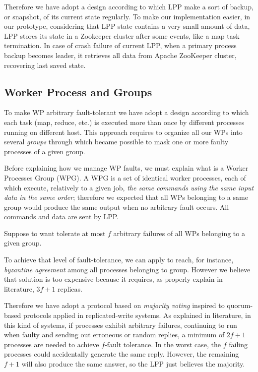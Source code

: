 \documentclass[sigchi]{acmart}
\begin{document}
Therefore we have adopt a design according to which LPP make a sort of backup, or snapshot, of its current state regularly. To make our implementation easier, in our prototype, considering that LPP state contains a very small amount of data, LPP stores its state in a Zookeeper cluster after some events, like a map task termination. In case of crash failure of current LPP, when a primary process backup becomes leader, it retrieves all data from Apache ZooKeeper cluster, recovering last saved state.

\subsection{Worker Process and Groups}

To make WP arbitrary fault-tolerant we have adopt a design according to which each task (map, reduce, etc.) is executed more than once by different processes running on different host. This approach requires to organize all our WPs into several \textit{groups} through which became possible to mask one or more faulty processes of a given group. 

Before explaining how we manage WP faults, we must explain what is a Worker Processes Group (WPG). A WPG is a set of identical worker processes, each of which execute, relatively to a given job, \textit{the same commands using the same input data in the same order}; therefore we expected that all WPs belonging to a same group would produce the same output when no arbitrary fault occurs. All commands and data are sent by LPP.

Suppose to want tolerate at most $f$ arbitrary failures of all WPs belonging to a given group. 

To achieve that level of fault-tolerance, we can apply to reach, for instance, \textit{byzantine agreement} among all processes belonging to group. However we believe that solution is too expensive because it requires, as properly explain in literature\citep{SDCC}, $3f + 1$ replicas.

Therefore we have adopt a protocol based on \textit{majority voting} inspired to quorum-based protocols applied in replicated-write systems. As explained in literature\citep{SDCC}, in this kind of systems, if processes exhibit arbitrary failures, continuing to run when faulty and sending out erroneous or random replies, a minimum of $2f+1$ processes are needed to achieve $f$-fault tolerance. In the worst case, the $f$ failing processes could accidentally generate the same reply. However, the remaining $f+1$ will also produce the same answer, so the LPP just believes the majority.
\end{document}

